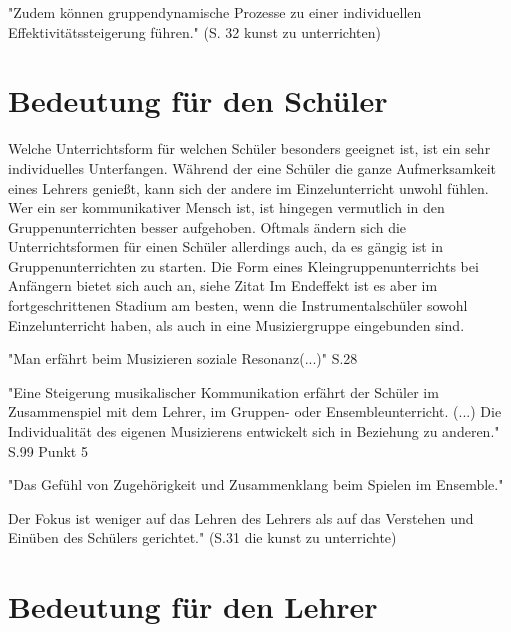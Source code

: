 "Zudem können gruppendynamische Prozesse zu einer individuellen
Effektivitätssteigerung führen." (S. 32 kunst zu unterrichten)

\section{Bedeutung für den Schüler}
Welche Unterrichtsform für welchen Schüler besonders geeignet ist, ist ein sehr
individuelles Unterfangen. Während der eine Schüler die ganze Aufmerksamkeit
eines Lehrers genießt, kann sich der andere im Einzelunterricht unwohl fühlen.
Wer ein ser kommunikativer Mensch ist, ist hingegen vermutlich in den
Gruppenunterrichten besser aufgehoben. Oftmals ändern sich die Unterrichtsformen
für einen Schüler allerdings auch, da es gängig ist in Gruppenunterrichten zu
starten. Die Form eines Kleingruppenunterrichts bei Anfängern bietet sich auch
an, siehe Zitat \autocite[220]{busch:grundwissen_instrumentalpaedagogik}
Im Endeffekt ist es aber im fortgeschrittenen Stadium am besten, wenn die
Instrumentalschüler sowohl Einzelunterricht haben, als auch in eine
Musiziergruppe eingebunden sind. 

"Man erfährt beim Musizieren soziale Resonanz(...)" S.28

"Eine Steigerung musikalischer Kommunikation erfährt der Schüler im
Zusammenspiel mit dem Lehrer, im Gruppen- oder Ensembleunterricht. (...) Die Individualität des eigenen Musizierens entwickelt sich in
Beziehung zu
anderen."  S.99 Punkt 5

"Das Gefühl von Zugehörigkeit und Zusammenklang beim Spielen im Ensemble."

Der Fokus ist weniger auf
das Lehren des Lehrers als auf das Verstehen und Einüben des Schülers
gerichtet."  (S.31 die kunst zu unterrichte)


\section{Bedeutung für den Lehrer}

